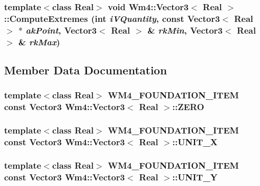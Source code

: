 \subsubsection{\setlength{\rightskip}{0pt plus 5cm}template$<$class Real$>$ void {\bf Wm4::Vector3}$<$ Real $>$::Compute\-Extremes (int {\em i\-VQuantity}, const {\bf Vector3}$<$ Real $>$ $\ast$ {\em ak\-Point}, {\bf Vector3}$<$ Real $>$ \& {\em rk\-Min}, {\bf Vector3}$<$ Real $>$ \& {\em rk\-Max})\hspace{0.3cm}{\tt  [static]}}\label{classWm4_1_1Vector3_1233f448d7976cbf265253e79c9cfa7c}




\subsection{Member Data Documentation}
\subsubsection{\setlength{\rightskip}{0pt plus 5cm}template$<$class Real$>$ WM4\_\-FOUNDATION\_\-ITEM const {\bf Vector3} {\bf Wm4::Vector3}$<$ Real $>$::{\bf ZERO}\hspace{0.3cm}{\tt  [static]}}\label{classWm4_1_1Vector3_f350845e64d6c0bbd9d9ee1a3e71c579}


\subsubsection{\setlength{\rightskip}{0pt plus 5cm}template$<$class Real$>$ WM4\_\-FOUNDATION\_\-ITEM const {\bf Vector3} {\bf Wm4::Vector3}$<$ Real $>$::{\bf UNIT\_\-X}\hspace{0.3cm}{\tt  [static]}}\label{classWm4_1_1Vector3_e0d46e617795d333aad32b1281e80f5f}


\subsubsection{\setlength{\rightskip}{0pt plus 5cm}template$<$class Real$>$ WM4\_\-FOUNDATION\_\-ITEM const {\bf Vector3} {\bf Wm4::Vector3}$<$ Real $>$::{\bf UNIT\_\-Y}\hspace{0.3cm}{\tt  [static]}}\label{classWm4_1_1Vector3_4ae2bc6a0a63b061c4776ca47af8f8c3}


